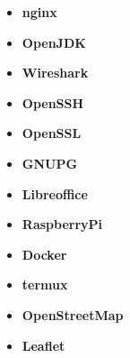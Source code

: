\begin{itemize}
  \item \textbf{nginx}
  \item \textbf{OpenJDK}
  \item \textbf{Wireshark}
  \item \textbf{OpenSSH}
  \item \textbf{OpenSSL}
  \item \textbf{GNUPG}
  \item \textbf{Libreoffice}
  \item \textbf{RaspberryPi}
  \item \textbf{Docker}
  \item \textbf{termux}
  \item \textbf{OpenStreetMap}
  \item \textbf{Leaflet}
\end{itemize}

% 
